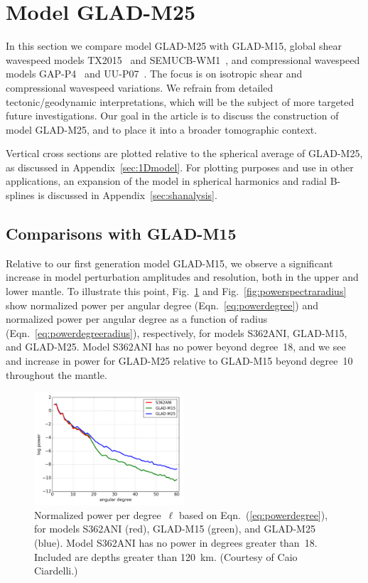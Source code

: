 \documentclass[extra,mreferee]{gji}
\begin{document}
\section{Model GLAD-M25}
\label{section:model}

In this section we compare model GLAD-M25 with GLAD-M15,
global shear wavespeed models 
TX2015~\citep{TX2015} and SEMUCB-WM1~\citep{french2015broad},
and compressional wavespeed models GAP-P4~\citep{fukao2013subducted} and UU-P07~\citep{van2018atlas}.
The focus is on isotropic shear and compressional wavespeed variations.
We refrain from detailed tectonic/geodynamic interpretations,
which will be the subject of more targeted future investigations.
Our goal in the article is to discuss the construction of model GLAD-M25,
and to place it into a broader tomographic context. 

Vertical cross sections are plotted relative to the spherical average of GLAD-M25,
as discussed in Appendix~\ref{sec:1Dmodel}.
For plotting purposes and use in other applications,
an expansion of the model in spherical harmonics and radial B-splines is
discussed in Appendix~\ref{sec:shanalysis}.

\subsection{Comparisons with GLAD-M15}

Relative to our first generation model GLAD-M15,
we observe a significant increase in model perturbation amplitudes and resolution,
both in the upper and lower mantle.
To illustrate this point,
Fig.~\ref{fig:power} and Fig.~\ref{fig:powerspectraradius} show normalized power per angular degree (Eqn.~\ref{eq:powerdegree}) and normalized power per angular degree as a function of radius (Eqn.~\ref{eq:powerdegreeradius}), respectively, for models S362ANI, GLAD-M15, and GLAD-M25.
Model S362ANI has no power beyond degree~18,
and we see and increase in power for GLAD-M25 relative to GLAD-M15 beyond degree~10 throughout the mantle.

\begin{figure}
  \centering
  \includegraphics[width=0.5\textwidth]{figures/power.pdf}
  \caption{\small{Normalized power per degree~$\ell$ based on Eqn.~(\ref{eq:powerdegree}), for models S362ANI (red), GLAD-M15 (green), and GLAD-M25 (blue).
  Model S362ANI has no power in degrees greater than~18.
  Included are depths greater than 120~km.
  (Courtesy of Caio Ciardelli.)
  }}
  \label{fig:power}
\end{figure}
\end{document}
